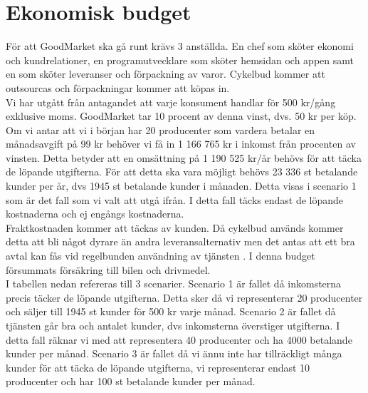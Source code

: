 \documentclass[10pt,a4paper,oneside]{article}
\begin{document}
\newpage

\section{Ekonomisk budget}
För att GoodMarket ska gå runt krävs 3 anställda. En chef som sköter ekonomi och kundrelationer, en programutvecklare som sköter hemsidan och appen samt en som sköter leveranser och förpackning av varor. Cykelbud kommer att outsourcas och förpackningar kommer att köpas in. \\

Vi har utgått från antagandet att varje konsument handlar för 500 kr/gång exklusive moms. GoodMarket tar 10 procent av denna vinst, dvs. 50 kr per köp. Om vi antar att vi i början har 20 producenter som vardera betalar en månadsavgift på 99 kr behöver vi få in 1 166 765 kr i inkomst från procenten av vinsten. Detta betyder att en omsättning på 1 190 525 kr/år behövs för att täcka de löpande utgifterna. För att detta ska vara möjligt behövs 23 336 st betalande kunder per år, dvs 1945 st betalande kunder i månaden. Detta visas i scenario 1 som är det fall som vi valt att utgå ifrån. I detta fall täcks endast de löpande kostnaderna och ej engångs kostnaderna. \\

Fraktkostnaden kommer att täckas av kunden. Då cykelbud används kommer detta att bli något dyrare än andra leveransalternativ men det antas att ett bra avtal kan fås vid regelbunden användning av tjänsten \cite{Movebybike}. I denna budget försummats försäkring till bilen och drivmedel. \\

I tabellen nedan refereras till 3 scenarier. Scenario 1 är fallet då inkomsterna precis täcker de löpande utgifterna. Detta sker då vi representerar 20 producenter och säljer till 1945 st kunder för 500 kr varje månad. Scenario 2 är fallet då tjänsten går bra och antalet kunder, dvs inkomsterna överstiger utgifterna. I detta fall räknar vi med att representera 40 producenter och ha 4000 betalande kunder per månad. Scenario 3 är fallet då vi ännu inte har tillräckligt många kunder för att täcka de löpande utgifterna, vi representerar endast 10 producenter och har 100 st betalande kunder per månad. 

\newpage
\end{document}
